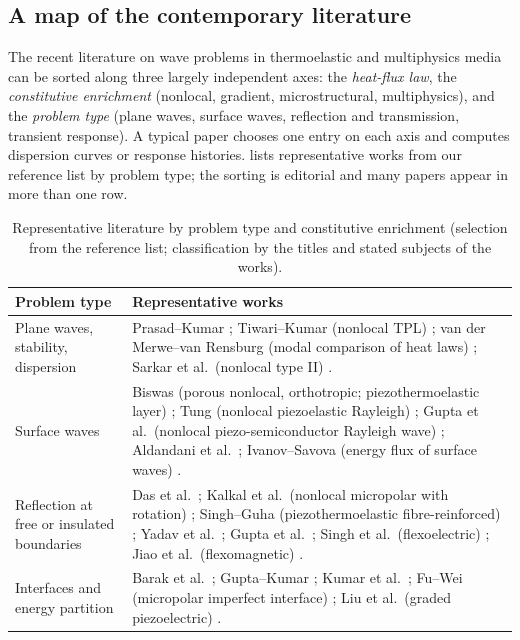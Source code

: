 \subsection{A map of the contemporary literature}
The recent literature on wave problems in thermoelastic and multiphysics media can be sorted along three largely independent axes: the \emph{heat-flux law}, the \emph{constitutive enrichment} (nonlocal, gradient, microstructural, multiphysics), and the \emph{problem type} (plane waves, surface waves, reflection and transmission, transient response). A typical paper chooses one entry on each axis and computes dispersion curves or response histories.  lists representative works from our reference list by problem type; the sorting is editorial and many papers appear in more than one row.

\begin{table}[t]\centering\small
\caption{Representative literature by problem type and constitutive enrichment (selection from the reference list; classification by the titles and stated subjects of the works).}\label{tab:streams}
\begin{tabularx}{\textwidth}{@{}p{3.2cm}X@{}}\toprule
Problem type & Representative works\\\midrule
Plane waves, stability, dispersion & Prasad--Kumar \citep{Prasad2020}; Tiwari--Kumar (nonlocal TPL) \citep{Tiwari2021}; van der Merwe--van Rensburg (modal comparison of heat laws) \citep{vanDerMerwe2021}; Sarkar et al.\ (nonlocal type II) \citep{Sarkar2019}.\\
Surface waves & Biswas (porous nonlocal, orthotropic; piezothermoelastic layer) \citep{Biswas2020a,Biswas2020}; Tung (nonlocal piezoelastic Rayleigh) \citep{Tung2019}; Gupta et al.\ (nonlocal piezo-semiconductor Rayleigh wave) \citep{Gupta2024}; Aldandani et al.\ \citep{Aldandani2026}; Ivanov--Savova (energy flux of surface waves) \citep{IvanovSavova1991}.\\
Reflection at free or insulated boundaries & Das et al.\ \citep{Das2008}; Kalkal et al.\ (nonlocal micropolar with rotation) \citep{Kalkal2020}; Singh--Guha (piezothermoelastic fibre-reinforced) \citep{Singh2020b}; Yadav et al.\ \citep{Yadav2023}; Gupta et al.\ \citep{Gupta2024a}; Singh et al.\ (flexoelectric) \citep{Singh2020c}; Jiao et al.\ (flexomagnetic) \citep{Jiao2024}.\\
Interfaces and energy partition & Barak et al.\ \citep{Barak2023,Barak2023IJP,Barak2023JTS,Barak2023MMMS}; Gupta--Kumar \citep{Gupta2023IJNMF,Gupta2023Energy}; Kumar et al.\ \citep{Kumar2023PhysScr,Kumar2019,Kumar2022,Kumar2024,Kumar2024a,Kumar2025,KumarKansal2017,Kumar2018}; Fu--Wei (micropolar imperfect interface) \citep{Fu2013}; Liu et al.\ (graded piezoelectric) \citep{Liu2020}.\\

\end{tabularx}
\end{table}
